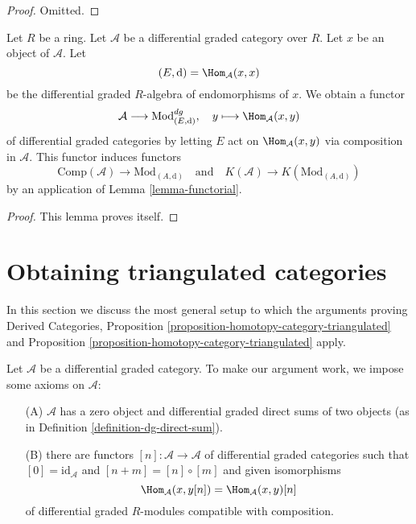 \begin{proof}
Omitted.
\end{proof}

\begin{lemma}
\label{lemma-construction}
Let $R$ be a ring. Let $\mathcal{A}$ be a differential graded category
over $R$. Let $x$ be an object of $\mathcal{A}$. Let
$$
(E, \text{d}) = \Hom_\mathcal{A}(x, x)
$$
be the differential graded $R$-algebra of endomorphisms of $x$.
We obtain a functor
$$
\mathcal{A} \longrightarrow \text{Mod}^{dg}_{(E, \text{d})},\quad
y \longmapsto \Hom_\mathcal{A}(x, y)
$$
of differential graded categories by letting $E$ act on
$\Hom_\mathcal{A}(x, y)$ via composition in $\mathcal{A}$.
This functor induces functors
$$
\text{Comp}(\mathcal{A}) \to \text{Mod}_{(A, \text{d})}
\quad\text{and}\quad
K(\mathcal{A}) \to K(\text{Mod}_{(A, \text{d})})
$$
by an application of Lemma \ref{lemma-functorial}.
\end{lemma}

\begin{proof}
This lemma proves itself.
\end{proof}









\section{Obtaining triangulated categories}
\label{section-review}

\noindent
In this section we discuss the most general setup to which the arguments
proving Derived Categories, Proposition
\ref{proposition-homotopy-category-triangulated} and
Proposition \ref{proposition-homotopy-category-triangulated} apply.

\medskip\noindent
Let $\mathcal{A}$ be a differential graded category. To make our argument
work, we impose some axioms on $\mathcal{A}$:
\begin{enumerate}
\item[(A)] $\mathcal{A}$ has a zero object and differential
graded direct sums of two objects
(as in Definition \ref{definition-dg-direct-sum}).
\item[(B)] there are functors $[n] : \mathcal{A} \longrightarrow \mathcal{A}$
of differential graded categories such that
$[0] = \text{id}_\mathcal{A}$ and $[n + m] = [n] \circ [m]$
and given isomorphisms
$$
\Hom_\mathcal{A}(x, y[n]) = \Hom_\mathcal{A}(x, y)[n]
$$
of differential graded $R$-modules compatible with composition.
\end{enumerate}

